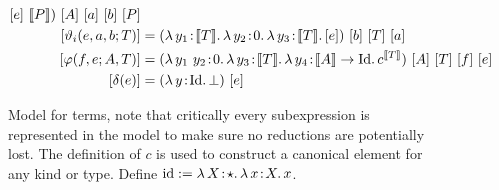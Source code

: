 \begin{figure}
\begin{align*}
{{{                        [e]\ \sema{P}
                    }
                }
            })\ [A]\ [a]\ [b]\ [P] \\
        [\vartheta_i(e, a, b; T)] &= (\abs{\lambda}{y_1}{\sema{T}}{
            \abs{\lambda}{y_2}{0} {
                \abs{\lambda}{y_3}{\sema{T}}{
                    [e]
                }
            }
        })\ [b]\ [T]\ [a] \\
        [\varphi(f, e; A, T)] &= (\abs{\lambda}{y_1\ y_2}{0}{
            \abs{\lambda}{y_3}{\sema{T}}{
                \abs{\lambda}{y_4}{\sema{A} \to \fpId}{
                    c^{\sema{T}}
                }
            }
        })\ [A]\ [T]\ [f]\ [e] \\
        [\delta(e)] &= (\abs{\lambda}{y}{\fpId}{
            \bot
        })\ [e]
    \end{align*}
    \caption{
        Model for terms, note that critically every subexpression is represented in the model to make sure no reductions are potentially lost.
        The definition of $c$ is used to construct a canonical element for any kind or type.
        Define $\text{id} := {\lambda}\, X\! : \! \star.\, 
            {\lambda}\, x\! : \! X.\, x
       $.
    }
    \label{fig:3:model_terms}
\end{figure}
